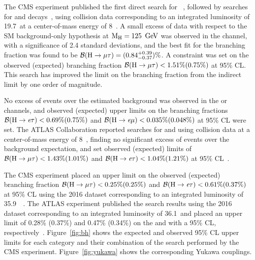 The CMS experiment published the first direct search for \Hmt~\cite{Khachatryan:2015kon}, followed by searches for \Het and \Hem decays~\cite{Khachatryan:2016rke}, using \pp collision data corresponding to an integrated luminosity of 19.7~\fb at a center-of-mass energy of 8~\TeV. A small excess of data with respect to the SM background-only hypothesis at $\text{M}_{\text{H}} = 125~\,\text{Ge\hspace{-.08em}V}$ was observed in the \Hmt channel, with a significance of 2.4 standard deviations, and the best fit for the branching fraction was found to be $\mathcal{B}(\text{H} \to \mu \tau) = (0.84^{+0.39}_{-0.37})\%$. A constraint was set on the observed (expected) branching fraction $\mathcal{B}(\text{H} \to \mu \tau) < 1.51\% (0.75\%)$ at 95\% CL. This search has improved the limit on the branching fraction \BHmt from the indirect limit by one order of magnitude.

No excess of events over the estimated background was observed in the \Het or \Hem channels, and observed (expected) upper limits on the branching fractions $\mathcal{B}(\text{H} \to \textit{e} \tau) < 0.69\% (0.75\%)$ and $\mathcal{B}(\text{H} \to \textit{e} \mu) < 0.035\% (0.048\%)$ at 95\% CL were set. The ATLAS Collaboration reported searches for \Het and \Hmt using \pp collision data at a center-of-mass energy of 8~\TeV, finding no significant excess of events over the background expectation, and set observed (expected) limits of $\mathcal{B}(\text{H} \to \mu \tau) < 1.43\% (1.01\%)$ and $\mathcal{B}(\text{H} \to \textit{e} \tau) < 1.04\% (1.21\%)$ at 95\% CL~\cite{Aad:2016blu, Aad:2015gha}.

The CMS experiment placed an upper limit on the observed (expected) branching fraction $\mathcal{B}(\text{H} \to \mu \tau) < 0.25\% (0.25\%)$ and $\mathcal{B}(\text{H} \to \textit{e} \tau) < 0.61\% (0.37\%)$ at 95\% CL using the 2016 dataset corresponding to an integrated luminosity of 35.9~\fb~\cite{Sirunyan:2017xzt}. The ATLAS experiment published the search results using the 2016 dataset corresponding to an integrated luminosity of 36.1~\fb and placed an upper limit of 0.28\% (0.37\%) and 0.47\% (0.34\%) on the \BHmt and \BHet with a 95\% CL, respectively~\cite{Aad:2019ugc}. Figure~\ref{fig:bh} shows the expected and observed 95\% CL upper limits for each category and their combination of the search performed by the CMS experiment. Figure~\ref{fig:yukawa} shows the corresponding Yukawa couplings.


